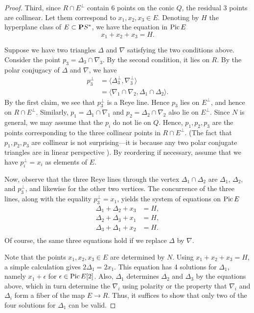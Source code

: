 \documentclass[11pt,reqno]{amsart}
\theoremstyle{plain}
\theoremstyle{definition}
\theoremstyle{remark}
\numberwithin{equation}{section}
\renewcommand{\to}{{\longrightarrow}}
\numberwithin{equation}{section}
\begin{document}
\begin{proof}
  Third, since $R \cap E^\perp$ contain 6 points on the conic $Q$, the residual 3 points are collinear.
  Let them correspond to $x_1, x_2, x_3 \in E$.
  Denoting by $H$ the hyperplane class of $E \subset \P S^*$, we have the equation in $\Pic E$
  \[ x_1 + x_2 + x_3 = H.\]
  
  Suppose we have two triangles $\Delta$ and $\nabla$ satisfying the two conditions above.
  Consider the point $p_3 = \Delta_3 \cap \nabla_3$.
  By the second condition, it lies on $R$.
  By the polar conjugacy of $\Delta$ and $\nabla$, we have
  \begin{align*}
    p_3^\perp &= \langle \Delta_3^\perp, \nabla_3^\perp \rangle \\
              &= \langle  \nabla_1 \cap \nabla_2, \Delta_1 \cap \Delta_2\rangle.
  \end{align*}
  By the first claim, we see that $p_3^\perp$ is a Reye line.
  Hence $p_3$ lies on $E^\perp$, and hence on $R \cap E^\perp$.
  Similarly, $p_1 = \Delta_1 \cap \nabla_1$ and $p_2 = \Delta_2 \cap \nabla_2$ also lie on $E^\perp$.
  Since $N$ is general, we may assume that the $p_i$ do not lie on $Q$.
  Hence, $p_1, p_2, p_3$ are the points corresponding to the three collinear points in $R \cap E^\perp$.
  (The fact that $p_1, p_2, p_3$ are collinear is not surprising---it is because any two polar conjugate triangles are in linear perspective \cite[Theorem~2.1.9]{dol:12}).
  By reordering if necessary, assume that we have $p_i^\perp = x_i$ as elements of $E$.

  Now, observe that the three Reye lines through the vertex $\Delta_1 \cap \Delta_2$ are $\Delta_1$, $\Delta_2$, and $p_3^\perp$, and likewise for the other two vertices.
  The concurrence of the three lines, along with the equality $p_3^\perp = x_1$, yields the system of equations on $\Pic E$
  \begin{align*}
    \Delta_1 + \Delta_2 + x_3 &= H, \\
    \Delta_2 + \Delta_3 + x_1 &= H, \\
    \Delta_3 + \Delta_1 + x_2 &= H. \\
  \end{align*}
  Of course, the same three equations hold if we replace $\Delta$ by $\nabla$.

  Note that the points $x_1, x_2, x_3 \in E$ are determined by $N$.
  Using $x_1 + x_2 + x_3 = H$, a simple calculation gives $2 \Delta_1 = 2x_1$.
  This equation has 4 solutions for $\Delta_1$, namely $x_1 + \epsilon$ for $\epsilon \in \Pic E[2]$.
  Also, $\Delta_1$ determines $\Delta_2$ and $\Delta_3$ by the equations above, which in turn determine the $\nabla_i$ using polarity or the property that $\nabla_i$ and $\Delta_i$ form a fiber of the map $E \to R$.
  Thus, it suffices to show that only two of the four solutions for $\Delta_1$ can be valid.


\end{proof}
\end{document}

